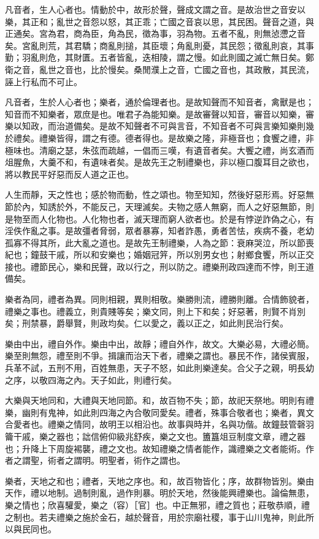 \begin{pinyinscope}
凡音者，生人心者也。情動於中，故形於聲，聲成文謂之音。是故治世之音安以樂，其正和；亂世之音怨以怒，其正乖；亡國之音哀以思，其民困。聲音之道，與正通矣。宮為君，商為臣，角為民，徵為事，羽為物。五者不亂，則無惉懘之音矣。宮亂則荒，其君驕；商亂則搥，其臣壞；角亂則憂，其民怨；徵亂則哀，其事勤；羽亂則危，其財匱。五者皆亂，迭相陵，謂之慢。如此則國之滅亡無日矣。鄭衛之音，亂世之音也，比於慢矣。桑閒濮上之音，亡國之音也，其政散，其民流，誣上行私而不可止。

凡音者，生於人心者也；樂者，通於倫理者也。是故知聲而不知音者，禽獸是也；知音而不知樂者，眾庶是也。唯君子為能知樂。是故審聲以知音，審音以知樂，審樂以知政，而治道備矣。是故不知聲者不可與言音，不知音者不可與言樂知樂則幾於禮矣。禮樂皆得，謂之有德。德者得也。是故樂之隆，非極音也；食饗之禮，非極味也。清廟之瑟，朱弦而疏越，一倡而三嘆，有遺音者矣。大饗之禮，尚玄酒而俎腥魚，大羹不和，有遺味者矣。是故先王之制禮樂也，非以極口腹耳目之欲也，將以教民平好惡而反人道之正也。

人生而靜，天之性也；感於物而動，性之頌也。物至知知，然後好惡形焉。好惡無節於內，知誘於外，不能反己，天理滅矣。夫物之感人無窮，而人之好惡無節，則是物至而人化物也。人化物也者，滅天理而窮人欲者也。於是有悖逆詐偽之心，有淫佚作亂之事。是故彊者脅弱，眾者暴寡，知者詐愚，勇者苦怯，疾病不養，老幼孤寡不得其所，此大亂之道也。是故先王制禮樂，人為之節：衰麻哭泣，所以節喪紀也；鐘鼓干戚，所以和安樂也；婚姻冠笄，所以別男女也；射鄉食饗，所以正交接也。禮節民心，樂和民聲，政以行之，刑以防之。禮樂刑政四達而不悖，則王道備矣。

樂者為同，禮者為異。同則相親，異則相敬。樂勝則流，禮勝則離。合情飾貌者，禮樂之事也。禮義立，則貴賤等矣；樂文同，則上下和矣；好惡著，則賢不肖別矣；刑禁暴，爵舉賢，則政均矣。仁以愛之，義以正之，如此則民治行矣。

樂由中出，禮自外作。樂由中出，故靜；禮自外作，故文。大樂必易，大禮必簡。樂至則無怨，禮至則不爭。揖讓而治天下者，禮樂之謂也。暴民不作，諸侯賓服，兵革不試，五刑不用，百姓無患，天子不怒，如此則樂達矣。合父子之親，明長幼之序，以敬四海之內。天子如此，則禮行矣。

大樂與天地同和，大禮與天地同節。和，故百物不失；節，故祀天祭地。明則有禮樂，幽則有鬼神，如此則四海之內合敬同愛矣。禮者，殊事合敬者也；樂者，異文合愛者也。禮樂之情同，故明王以相沿也。故事與時并，名與功偕。故鐘鼓管磬羽籥干戚，樂之器也；詘信俯仰級兆舒疾，樂之文也。簠簋俎豆制度文章，禮之器也；升降上下周旋裼襲，禮之文也。故知禮樂之情者能作，識禮樂之文者能術。作者之謂聖，術者之謂明。明聖者，術作之謂也。

樂者，天地之和也；禮者，天地之序也。和，故百物皆化；序，故群物皆別。樂由天作，禮以地制。過制則亂，過作則暴。明於天地，然後能興禮樂也。論倫無患，樂之情也；欣喜驩愛，樂之（容）［官］也。中正無邪，禮之質也；莊敬恭順，禮之制也。若夫禮樂之施於金石，越於聲音，用於宗廟社稷，事于山川鬼神，則此所以與民同也。


\end{pinyinscope}
